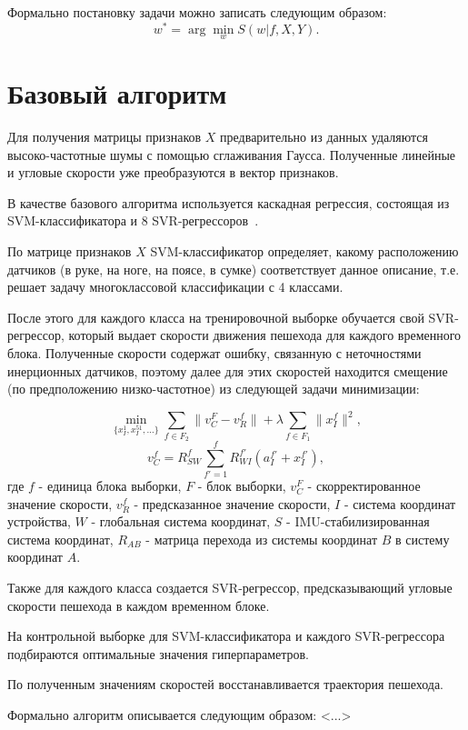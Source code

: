 \documentclass[12pt,twoside]{article}
\begin{document}
Формально постановку задачи можно записать следующим образом:
\[w^* = \arg\min_{w}S(w|f, X, Y).\]

\section{Базовый алгоритм}

Для получения матрицы признаков $X$ предварительно из данных удаляются высоко-частотные шумы с помощью сглаживания Гаусса. Полученные линейные и угловые скорости уже преобразуются в вектор признаков.

В качестве базового алгоритма используется каскадная регрессия, состоящая из SVM-классификатора и 8 SVR-регрессоров~\cite{journals/corr/abs-1712-09004}. 

По матрице признаков $X$ SVM-классификатор определяет, какому расположению датчиков (в руке, на ноге, на поясе, в сумке) соответствует данное описание, т.е. решает задачу многоклассовой классификации с 4 классами.

После этого для каждого класса на тренировочной выборке обучается свой SVR-регрессор, который выдает скорости движения пешехода для каждого временного блока. Полученные скорости содержат ошибку, связанную с неточностями инерционных датчиков, поэтому далее для этих скоростей находится смещение (по предположению низко-частотное) из следующей задачи минимизации:

\[\min_{\{x^1_I, x^51_I,\dots\}}\sum_{f \in F_2}\|v_C^F-v_R^f\|+
\lambda\sum_{f \in F_1}\|x^f_I\|^2,\]
\[v_C^f = R_{SW}^f\sum_{f'=1}^f R_{WI}^{f'}(a_I^{f'}+x_I^{f'}),\]
где $f$ - единица блока выборки, $F$ - блок выборки, $v_C^F$ - скорректированное значение скорости, $v_R^f$ - предсказанное значение скорости, $I$ - система координат устройства, $W$ - глобальная система координат, $S$ - IMU-стабилизированная система координат, $R_{AB}$ - матрица перехода из системы координат $B$ в систему координат $A$.

Также для каждого класса создается SVR-регрессор, предсказывающий угловые скорости пешехода в каждом временном блоке. 

На контрольной выборке для SVM-классификатора и каждого SVR-регрессора подбираются оптимальные значения гиперпараметров.

По полученным значениям скоростей восстанавливается траектория пешехода.

Формально алгоритм описывается следующим образом: <...>





\end{document}
